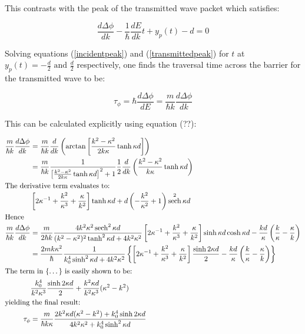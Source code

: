 \documentclass{article}
\DeclareMathOperator{\sech}{sech}
\begin{document}
\noindent This contrasts with the peak of the transmitted wave packet which satisfies:

\begin{equation}
	\frac{d\Delta\phi}{dk}-\frac{1}{\hbar}\frac{dE}{dk}t+y_p(t)-d=0
	\label{transmittedpeak}
\end{equation}

\noindent Solving equations (\ref{incidentpeak}) and (\ref{transmittedpeak}) for $t$ at $y_p(t) = -\frac{d}{2} \text{ and } \frac{d}{2}$ respectively, one finds the traversal time across the barrier for the transmitted wave to be:

\begin{equation}
	\tau_\phi = \hbar \frac{d\Delta\phi}{dE} = \frac{m}{\hbar k}\frac{d\Delta\phi}{dk}
\end{equation}

\noindent This can be calculated explicitly using equation (??):

\begin{align}
	\frac{m}{\hbar k}\frac{d\Delta\phi}{dk}&=\frac{m}{\hbar k}\frac{d}{dk}\left(\arctan{\left[\frac{k^2-\kappa^2}{2k\kappa}\tanh{\kappa d}\right]}\right) \\
					       &=\frac{m}{\hbar k}\frac{1}{\left[\frac{k^2-\kappa^2}{2k\kappa}\tanh{\kappa d}\right]^2+1}\frac{1}{2}\frac{d}{dk}\left(\frac{k^2-\kappa^2}{k\kappa}\tanh{\kappa d}\right) \\ \intertext{The derivative term evaluates to:}
					       &\left[2\kappa^{-1}+\frac{k^2}{\kappa^3}+\frac{\kappa}{k^2}\right]\tanh{\kappa d} + d\left(-\frac{k^2}{\kappa^2}+1\right)\sech^2{\kappa d}\\ \intertext{Hence}
	\frac{m}{\hbar k}\frac{d\Delta\phi}{dk}&=\frac{m}{2\hbar k}\frac{4k^2\kappa^2\sech^2{\kappa d}}{(k^2-\kappa^2)^2\tanh^2{\kappa d}+4k^2\kappa^2}\left[2\kappa^{-1}+\frac{k^2}{\kappa^3}+\frac{\kappa}{k^2}\right]\sinh{\kappa d}\cosh{\kappa d}-\frac{kd}{\kappa}\left(\frac{k}{\kappa}-\frac{\kappa}{k}\right)\\
					       &=\frac{2mk\kappa^2}{\hbar}\frac{1}{k_0^4\sinh^2{\kappa d}+4k^2\kappa^2}\left\{\left[2\kappa^{-1}+\frac{k^2}{\kappa^3}+\frac{\kappa}{k^2}\right]\frac{\sinh{2\kappa d}}{2}-\frac{kd}{\kappa}\left(\frac{k}{\kappa}-\frac{\kappa}{k}\right)\right\} \\ \intertext{The term in \{\dots\} is easily shown to be:}
					       & \frac{k_0^4}{k^2\kappa^3}\frac{\sinh{2\kappa d}}{2}+\frac{k^2\kappa d}{k^2\kappa^3}(\kappa^2-k^2) \\ \intertext{yielding the final result:}
	\tau_\phi &= \frac{m}{\hbar k \kappa}\frac{2k^2\kappa d(\kappa^2-k^2)+k_0^4\sinh{2\kappa d}}{4k^2\kappa^2+k_0^4\sinh^2{\kappa d}}
\end{align}
\end{document}
